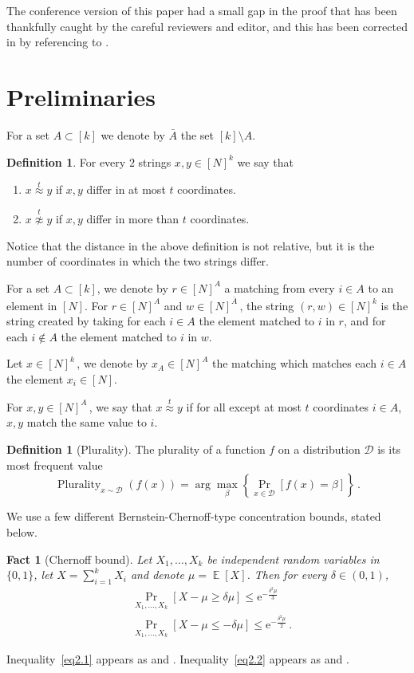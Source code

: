 \documentclass[11pt]{article}
\numberwithin{equation}{section}
\newtheorem{fact}[theorem]{Fact}
\theoremstyle{definition}
\newtheorem{definition}[theorem]{Definition}
\theoremstyle{plain}
\newcommand{\eee}{\mathrm e}
\newcommand{\Prob}[2][]{\Pr_{{#1}}\left[#2\right]} %
\DeclareMathOperator*{\E}{\mathbb{E}} %
\newcommand\neql[1]{\stackrel{{#1}}{ \approx}} %
\newcommand\neqg[1]{\stackrel{{#1}}{ \not\approx}} %
\DeclareMathOperator*\plur{\mathrm{Plurality}} %
\newcommand\rest[1]{{\bar{#1}}}  %
\begin{document}
%
The conference version of this paper had a small gap in the proof that 
has been thankfully caught by the careful reviewers and editor, and 
this has been corrected in  by 
referencing to \cite{IK10}.

\section{Preliminaries}\label{sec:notations}
For a set $A\subset[k]$ we denote by $\rest{A}$ the set $[k]\setminus A$.
\begin{definition}
	For every $2$ strings $x,y\in [N]^k$ we say that
	\begin{enumerate}
		\item {$x\neql{t} y$ if $x,y$ differ in at most $t$ coordinates.}
		\item {$x\neqg{t} y$ if $x,y$ differ in more than $t$ coordinates. }
	\end{enumerate}
\end{definition}
Notice that the distance in the above definition is not relative, but it is the number of coordinates in which the two strings differ.	

For a set $A\subset[k]$, we denote by $r\in[N]^A$ a matching from every $i\in A$ to an element in $[N]$. For $r\in[N]^A$ and $w\in [N]^{\rest{A}}$\,, the string $(r,w)\in [N]^k$ is the string created by taking for each $i\in A$ the element matched to $i$ in $r$, and for each $i\notin A$ the element matched to $i$ in $w$.

Let $x\in [N]^k$\,, we denote by $x_A\in [N]^A$ the matching which matches each $i\in A$ the element $x_i\in [N]$.

For $x,y\in [N]^A$\,, we say that $x\neql{t} y$ if for all except at most $t$ coordinates $i\in A$, $x,y$ match the same value to $i$.

\begin{definition}[Plurality]
	The plurality of a function $f$ on a distribution $\mathcal{D}$ is its most frequent value \[\plur_{x\sim\mathcal{D}}(f(x)) = \arg\max_{\beta}\left\{\Prob[x\in\mathcal{D}]{f(x) = \beta}\right\}\,.\] %
\end{definition}

%
We  %
use a few different %
Bernstein-Chernoff-type concentration bounds, stated below.
 
%
%
\begin{fact}[Chernoff bound]\label{fact:Chernoff}
	Let $X_1,\ldots, X_k$ be independent random variables in $\{0,1\}$, let $X=\sum_{i=1}^k X_i$ and denote $\mu=\E[X]$. Then for every $\delta\in(0,1)$,
\begin{align} %
%
&\Prob[X_1,\ldots, X_k]{X -\mu\geq \delta\mu}\leq \eee^{-\frac{\delta^2\mu}{3}}
  \label{eq2.1} \\ %
&\Prob[X_1,\ldots, X_k]{X -\mu\leq -\delta\mu}\leq \eee^{-\frac{\delta^2\mu}{2}}\,. \label{eq2.2} %
\end{align}  %
\end{fact}	
%
%
%
Inequality~\eqref{eq2.1} appears as \cite[Eq. (6)]{hagerup1990guided}
and \cite[Thm. 4.4.2]{MU2005}.  Inequality~\eqref{eq2.2} appears as
\cite[Eq. (7)]{hagerup1990guided} and \cite[Thm. 4.5.2]{MU2005}.  %
\end{document}
